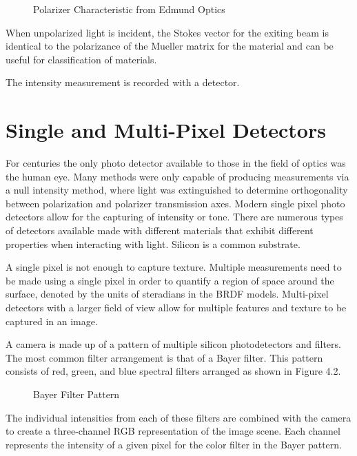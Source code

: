 \begin{figure}[!htb]
    \begin{center}
    \end{center}
    \caption{Polarizer Characteristic from Edmund Optics}
    \label{fig:polarization}
\end{figure}
When unpolarized light is incident, the Stokes vector for the exiting beam is identical to the polarizance of the Mueller matrix for the material and can be useful for classification of materials.

The intensity measurement is recorded with a detector.

\section{Single and Multi-Pixel Detectors}
For centuries the only photo detector available to those in the field of optics was the human eye.  Many methods were only capable of producing measurements via a null intensity method, where light was extinguished to determine orthogonality between polarization and polarizer transmission axes.  Modern single pixel photo detectors allow for the capturing of intensity or tone.  There are numerous types of detectors available made with different materials that exhibit different properties when interacting with light.  Silicon is a common substrate.

A single pixel is not enough to capture texture.  Multiple measurements need to be made using a single pixel in order to quantify a region of space around the surface, denoted by the units of steradians in the BRDF models.  Multi-pixel detectors with a larger field of view allow for multiple features and texture to be captured in an image.

A camera is made up of a pattern of multiple silicon photodetectors and filters.  The most common filter arrangement is that of a Bayer filter.  This pattern consists of red, green, and blue spectral filters arranged as shown in Figure 4.2.
\begin{figure}[!htb]
    \begin{center}
    \end{center}
    \caption{Bayer Filter Pattern}
    \label{fig:polarization}
\end{figure}
%
The individual intensities from each of these filters are combined with the camera to create a three-channel RGB representation of the image scene.  Each channel represents the intensity of a given pixel for the color filter in the Bayer pattern.

